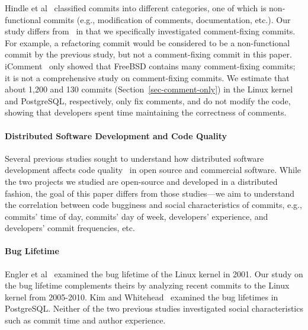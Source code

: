 Hindle et al~\cite{largeCommits} classified commits into different categories,
one of which is non-functional commits (e.g., modification of comments,
documentation, etc.).  Our study differs from~\cite{largeCommits} in that we
specifically investigated comment-fixing commits. For example, a refactoring
commit would be considered to be a non-functional commit by the previous study,
but not a comment-fixing commit in this paper. iComment~\cite{iComment} only
showed that FreeBSD contains many comment-fixing commits; it is not a
comprehensive study on comment-fixing commits.  We estimate that about 1,200 and
130 commits (Section~\ref{sec-comment-only}) in the Linux kernel and PostgreSQL,
respectively, only fix comments, and do not modify the code, showing that
developers spent time maintaining the correctness of comments.

\paragraph{Distributed Software Development and Code Quality}

Several previous studies sought to understand how distributed software
development affects code quality~\cite{distributed09, organizational08,
  global06} in open source and commercial software. While the two projects we studied are open-source and developed in a distributed fashion, the
goal of this paper differs from those studies---we aim to understand
the correlation between code bugginess and social characteristics of commits,
e.g., commits' time of day, commits' day of week, developers' experience, and
developers' commit frequencies, etc.

\paragraph{Bug Lifetime}

Engler et al~\cite{deviant} examined the bug lifetime of the Linux kernel in
2001. Our study on the bug lifetime complements theirs by analyzing recent
commits to the Linux kernel from 2005-2010.  Kim and Whitehead~\cite{2006-long}
examined the bug lifetimes in PostgreSQL.  Neither of the two previous studies
investigated social characteristics such as commit time and author experience.


